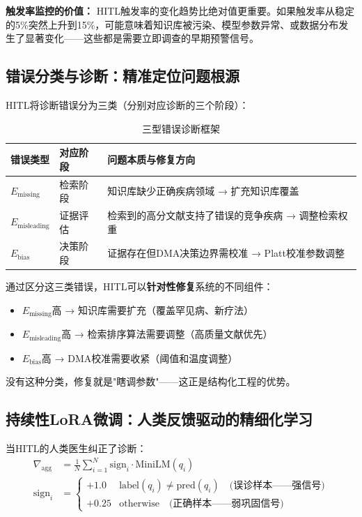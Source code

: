 \documentclass[11pt,a4paper]{ctexart}
\begin{document}
\textbf{触发率监控的价值：} HITL触发率的变化趋势比绝对值更重要。如果触发率从稳定的5\%突然上升到15\%，可能意味着知识库被污染、模型参数异常、或数据分布发生了显著变化——这些都是需要立即调查的早期预警信号。



\subsection{错误分类与诊断：精准定位问题根源}

HITL将诊断错误分为三类（分别对应诊断的三个阶段）：

\begin{table}[H]
\centering
\small
\begin{tabular}{llp{7cm}}
\toprule
\textbf{错误类型} & \textbf{对应阶段} & \textbf{问题本质与修复方向} \\
\midrule
$E_{\text{missing}}$ & 检索阶段 & 知识库缺少正确疾病领域 → 扩充知识库覆盖 \\
$E_{\text{misleading}}$ & 证据评估 & 检索到的高分文献支持了错误的竞争疾病 → 调整检索权重 \\
$E_{\text{bias}}$ & 决策阶段 & 证据存在但DMA决策边界需校准 → Platt校准参数调整 \\
\bottomrule
\end{tabular}
\caption{三型错误诊断框架}
\end{table}

\begin{keybox}[三型错误的诊断价值]
通过区分这三类错误，HITL可以\textbf{针对性修复}系统的不同组件：
\begin{itemize}[nosep]
\item $E_{\text{missing}}$高 → 知识库需要扩充（覆盖罕见病、新疗法）
\item $E_{\text{misleading}}$高 → 检索排序算法需要调整（高质量文献优先）
\item $E_{\text{bias}}$高 → DMA校准需要收紧（阈值和温度调整）
\end{itemize}
没有这种分类，修复就是"瞎调参数"——这正是结构化工程的优势。
\end{keybox}

\subsection{持续性LoRA微调：人类反馈驱动的精细化学习}

当HITL的人类医生纠正了诊断：
\begin{align}
\nabla_{\text{agg}} &= \frac{1}{N}\sum_{i=1}^N \text{sign}_i \cdot \text{MiniLM}(q_i) \\
\text{sign}_i &= \begin{cases}
+1.0 & \text{label}(q_i) \neq \text{pred}(q_i) \quad \text{(误诊样本——强信号)}\\
+0.25 & \text{otherwise} \quad \text{(正确样本——弱巩固信号)}
\end{cases}
\end{align}
\end{document}
